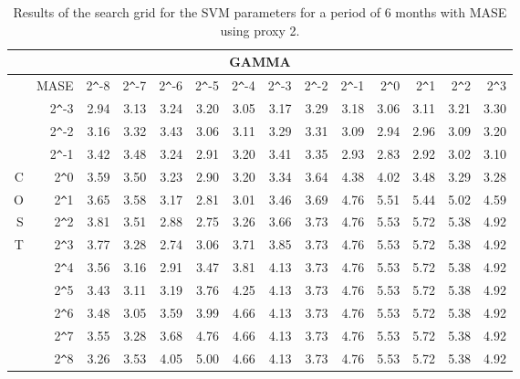 \begin{table}[h!]
\centering
\begin{adjustbox}{width=\textwidth}
\begin{tabular}{|r|r|rrrrrrrrrrrr|}
\hline
\multicolumn{14}{|c|}{GAMMA} \tabularnewline
\hline
    &MASE& 2\verb|^|-8 & 2\verb|^|-7 & 2\verb|^|-6 & 2\verb|^|-5 & 2\verb|^|-4 & 2\verb|^|-3 & 2\verb|^|-2 & 2\verb|^|-1 & 2\verb|^|0 & 2\verb|^|1 & 2\verb|^|2 & 2\verb|^|3 \\ 
  \hline
  &2\verb|^|-3 & 2.94 & 3.13 & 3.24 & 3.20 & 3.05 & 3.17 & 3.29 & 3.18 & 3.06 & 3.11 & 3.21 & 3.30 \\ 
  &2\verb|^|-2 & 3.16 & 3.32 & 3.43 & 3.06 & 3.11 & 3.29 & 3.31 & 3.09 & 2.94 & 2.96 & 3.09 & 3.20 \\ 
  &2\verb|^|-1 & 3.42 & 3.48 & 3.24 & 2.91 & 3.20 & 3.41 & 3.35 & 2.93 & 2.83 & 2.92 & 3.02 & 3.10 \\ 
  C&2\verb|^|0 & 3.59 & 3.50 & 3.23 & 2.90 & 3.20 & 3.34 & 3.64 & 4.38 & 4.02 & 3.48 & 3.29 & 3.28 \\ 
  O&2\verb|^|1 & 3.65 & 3.58 & 3.17 & 2.81 & 3.01 & 3.46 & 3.69 & 4.76 & 5.51 & 5.44 & 5.02 & 4.59 \\ 
  S&2\verb|^|2 & 3.81 & 3.51 & 2.88 & 2.75 & 3.26 & 3.66 & 3.73 & 4.76 & 5.53 & 5.72 & 5.38 & 4.92 \\ 
  T&2\verb|^|3 & 3.77 & 3.28 & 2.74 & 3.06 & 3.71 & 3.85 & 3.73 & 4.76 & 5.53 & 5.72 & 5.38 & 4.92 \\ 
  &2\verb|^|4 & 3.56 & 3.16 & 2.91 & 3.47 & 3.81 & 4.13 & 3.73 & 4.76 & 5.53 & 5.72 & 5.38 & 4.92 \\ 
  &2\verb|^|5 & 3.43 & 3.11 & 3.19 & 3.76 & 4.25 & 4.13 & 3.73 & 4.76 & 5.53 & 5.72 & 5.38 & 4.92 \\ 
  &2\verb|^|6 & 3.48 & 3.05 & 3.59 & 3.99 & 4.66 & 4.13 & 3.73 & 4.76 & 5.53 & 5.72 & 5.38 & 4.92 \\ 
  &2\verb|^|7 & 3.55 & 3.28 & 3.68 & 4.76 & 4.66 & 4.13 & 3.73 & 4.76 & 5.53 & 5.72 & 5.38 & 4.92 \\ 
  &2\verb|^|8 & 3.26 & 3.53 & 4.05 & 5.00 & 4.66 & 4.13 & 3.73 & 4.76 & 5.53 & 5.72 & 5.38 & 4.92 \\ 
   \hline
\end{tabular}
\end{adjustbox}
\caption{Results of the search grid for the SVM parameters for a period of 6 months with MASE using proxy 2.}
\end{table}